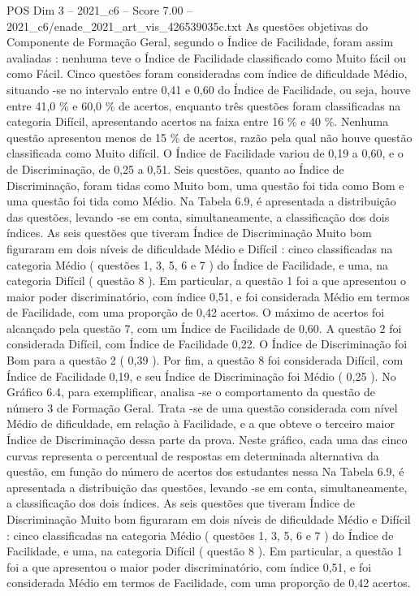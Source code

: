 \begin{textsample}{POS Dim 3 – 2021\_c6 – Score 7.00 – 2021\_c6/enade\_2021\_art\_vis\_426539035c.txt}
As questões objetivas do Componente de Formação Geral, segundo o Índice de Facilidade, foram assim avaliadas : nenhuma teve o Índice de Facilidade classificado como Muito fácil ou como Fácil.
Cinco questões foram consideradas com índice de dificuldade Médio, situando -se no intervalo entre 0,41 e 0,60 do Índice de Facilidade, ou seja, houve entre 41,0 \% e 60,0 \% de acertos, enquanto três questões foram classificadas na categoria Difícil, apresentando acertos na faixa entre 16 \% e 40 \%.
Nenhuma questão apresentou menos de 15 \% de acertos, razão pela qual não houve questão classificada como Muito difícil.
O Índice de Facilidade variou de 0,19 a 0,60, e o de Discriminação, de 0,25 a 0,51.
Seis questões, quanto ao Índice de Discriminação, foram tidas como Muito bom, uma questão foi tida como Bom e uma questão foi tida como Médio.
Na Tabela 6.9, é apresentada a distribuição das questões, levando -se em conta, simultaneamente, a classificação dos dois índices.
As seis questões que tiveram Índice de Discriminação Muito bom figuraram em dois níveis de dificuldade Médio e Difícil : cinco classificadas na categoria Médio ( questões 1, 3, 5, 6 e 7 ) do Índice de Facilidade, e uma, na categoria Difícil ( questão 8 ).
Em particular, a questão 1 foi a que apresentou o maior poder discriminatório, com índice 0,51, e foi considerada Médio em termos de Facilidade, com uma proporção de 0,42 acertos.
O máximo de acertos foi alcançado pela questão 7, com um Índice de Facilidade de 0,60.
A questão 2 foi considerada Difícil, com Índice de Facilidade 0,22.
O Índice de Discriminação foi Bom para a questão 2 ( 0,39 ).
Por fim, a questão 8 foi considerada Difícil, com Índice de Facilidade 0,19, e seu Índice de Discriminação foi Médio ( 0,25 ).
No Gráfico 6.4, para exemplificar, analisa -se o comportamento da questão de número 3 de Formação Geral.
Trata -se de uma questão considerada com nível Médio de dificuldade, em relação à Facilidade, e a que obteve o terceiro maior Índice de Discriminação dessa parte da prova.
Neste gráfico, cada uma das cinco curvas representa o percentual de respostas em determinada alternativa da questão, em função do número de acertos dos estudantes nessa Na Tabela 6.9, é apresentada a distribuição das questões, levando -se em conta, simultaneamente, a classificação dos dois índices.
As seis questões que tiveram Índice de Discriminação Muito bom figuraram em dois níveis de dificuldade Médio e Difícil : cinco classificadas na categoria Médio ( questões 1, 3, 5, 6 e 7 ) do Índice de Facilidade, e uma, na categoria Difícil ( questão 8 ).
Em particular, a questão 1 foi a que apresentou o maior poder discriminatório, com índice 0,51, e foi considerada Médio em termos de Facilidade, com uma proporção de 0,42 acertos.

\end{textsample}
